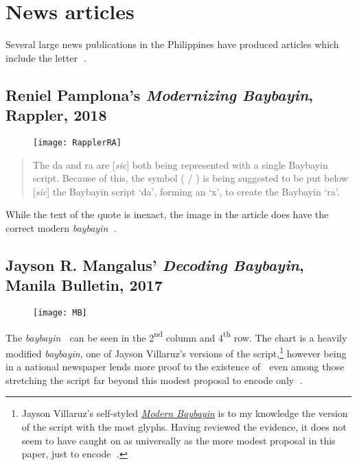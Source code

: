 \documentclass[a4paper,pagesize,openany,14pt,parskip=never]{scrbook}
\newcommand{\≈}{$\approx$}
\begin{document}
\section{News articles}

Several large news publications in the Philippines have produced articles which include the letter {\baybayin ᜍ}.

\subsection{Reniel Pamplona's {\em Modernizing Baybayin}, Rappler, 2018}
\label{MB2018}

\begin{figure}[H]
\texttt{[image: RapplerRA]}
\end{figure}

\begin{quote}
    The da and ra are [{\em sic}] both being represented with a single Baybayin script. Because of this, the symbol ( / ) is being suggested to be put below [{\em sic}] the Baybayin script ‘da’, forming an ‘x’, to create the Baybayin ‘ra’.
\end{quote}

While the text of the quote is inexact, the image in the article does have the correct modern {\em baybayin} {\baybayin ᜍ}.

\subsection{Jayson R. Mangalus' {\em Decoding Baybayin}, Manila Bulletin, 2017}

\begin{figure}[H]
\texttt{[image: MB]}
\end{figure}

The {\em baybayin} {\baybayin ᜍ} can be seen in the 2{\textsuperscript{nd}} column and 4{\textsuperscript{th}} row. The chart is a heavily modified {\em baybayin}, one of Jayson Villaruz's versions of the script,\footnote{Jayson Villaruz's self-styled \href{http://modernbaybayin.blogspot.com/}{{\em Modern Baybayin}} is to my knowledge the version of the script with the most glyphs. Having reviewed the evidence, it does not seem to have caught on as universally as the more modest proposal in this paper, just to encode {\baybayin ᜍ}.} however being in a national newspaper lends more proof to the existence of {\baybayin ᜍ} even among those stretching the script far beyond this modest proposal to encode only {\baybayin ᜍ}.
\end{document}
